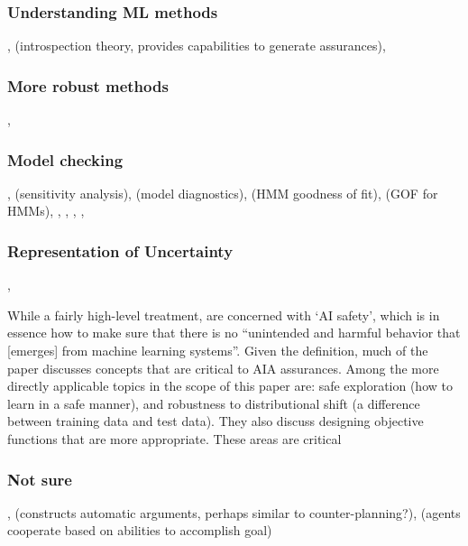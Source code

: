 \subsubsection{Understanding ML methods} \cite{Bakry2015-td}, \cite{Konolige1985-vx} (introspection theory, provides capabilities to generate assurances),  
\subsubsection{More robust methods} \cite{Bashivan2015-fc},  \cite{Tellex2012-hn}
\subsubsection{Model checking} \cite{Titman2008-ct}, \cite{Laskey1995-jp} (sensitivity analysis), \cite{Sinharay2006-yc} (model diagnostics), \cite{Titman2012-zw} (HMM goodness of fit), \cite{MacKay_Altman2004-fl} (GOF for HMMs), \cite{Dannemann2008-ch}, \cite{Titman2010-qx}, \cite{Johnson2004-mv}, \cite{Yuan2012-tb}, \cite{Spiegelhalter2002-ia}
\subsubsection{Representation of Uncertainty} \cite{Laskey2015-gz}, \cite{Costa2012-fa}

    While a fairly high-level treatment, \citet{Amodei2016-xi} are concerned with `AI safety', which is in essence how to make sure that there is no ``unintended and harmful behavior that [emerges] from machine learning systems''. Given the definition, much of the paper discusses concepts that are critical to AIA assurances. Among the more directly applicable topics in the scope of this paper are: safe exploration (how to learn in a safe manner), and robustness to distributional shift (a difference between training data and test data). They also discuss designing objective functions that are more appropriate. These areas are critical 

\subsubsection{Not sure} , \cite{Gutfreund2016-xe} (constructs automatic arguments, perhaps similar to counter-planning?), \cite{Charif2013-vo} (agents cooperate based on abilities to accomplish goal)

